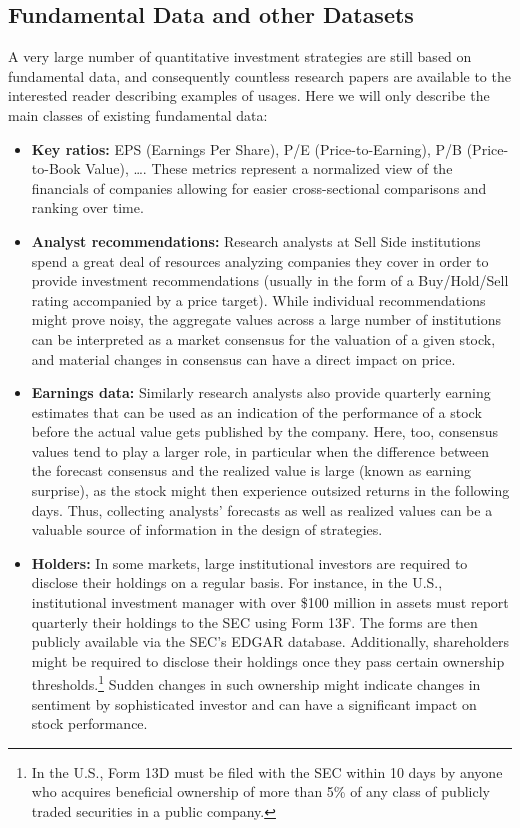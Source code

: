 \subsection{Fundamental Data and other Datasets}

A very large number of quantitative investment strategies are still based on fundamental data, and consequently countless research papers are available to the interested reader describing examples of usages. Here we will only describe the main classes of existing fundamental data:


\begin{itemize}
\item \textbf{Key ratios:} EPS (Earnings Per Share), P/E (Price-to-Earning), P/B (Price-to-Book Value), \dots. These metrics represent a normalized view of the financials of companies allowing for easier cross-sectional comparisons and ranking over time.


\item \textbf{Analyst recommendations:} Research analysts at Sell Side institutions spend a great deal of resources analyzing companies they cover in order to provide investment recommendations (usually in the form of a Buy/Hold/Sell rating accompanied by a price target). While individual recommendations might prove noisy, the aggregate values across a large number of institutions can be interpreted as a market consensus for the valuation of a given stock, and material changes in consensus can have a direct impact on price.


\item \textbf{Earnings data:} Similarly research analysts also provide quarterly earning estimates that can be used as an indication of the performance of a stock before the actual value gets published by the company. Here, too, consensus values tend to play a larger role, in particular when the difference between the forecast consensus and the realized value is large (known as earning surprise), as the stock might then experience outsized returns in the following days. Thus, collecting analysts' forecasts as well as realized values can be a valuable source of information in the design of strategies.


\item \textbf{Holders:} In some markets, large institutional investors are required to disclose their holdings on a regular basis. For instance, in the U.S., institutional investment manager with over \$100 million in assets must report quarterly their holdings to the SEC using Form 13F. The forms are then publicly available via the SEC's EDGAR database. Additionally, shareholders might be required to disclose their holdings once they pass certain ownership thresholds.\footnote{In the U.S., Form 13D must be filed with the SEC within 10 days by anyone who acquires beneficial ownership of more than 5\% of any class of publicly traded securities in a public company.} Sudden changes in such ownership might indicate changes in sentiment by sophisticated investor and can have a significant impact on stock performance.



\end{itemize}
